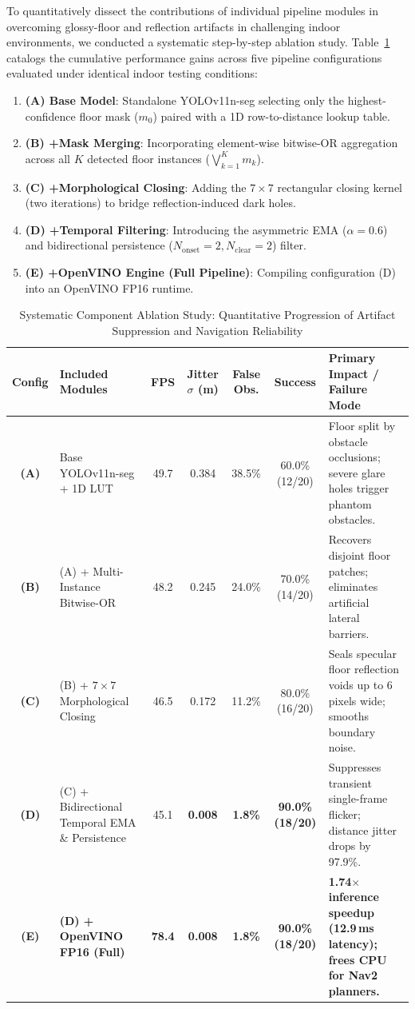 \documentclass{ieeeaccess}
\begin{document}
To quantitatively dissect the contributions of individual pipeline modules in overcoming glossy-floor and reflection artifacts in challenging indoor environments, we conducted a systematic step-by-step ablation study. Table~\ref{tab:ablation_study} catalogs the cumulative performance gains across five pipeline configurations evaluated under identical indoor testing conditions:
\begin{enumerate}
  \item \textbf{(A) Base Model}: Standalone YOLOv11n-seg selecting only the highest-confidence floor mask ($m_0$) paired with a 1D row-to-distance lookup table.
  \item \textbf{(B) +Mask Merging}: Incorporating element-wise bitwise-OR aggregation across all $K$ detected floor instances ($\bigvee_{k=1}^K m_k$).
  \item \textbf{(C) +Morphological Closing}: Adding the $7 \times 7$ rectangular closing kernel (two iterations) to bridge reflection-induced dark holes.
  \item \textbf{(D) +Temporal Filtering}: Introducing the asymmetric EMA ($\alpha=0.6$) and bidirectional persistence ($N_{\mathrm{onset}}=2, N_{\mathrm{clear}}=2$) filter.
  \item \textbf{(E) +OpenVINO Engine (Full Pipeline)}: Compiling configuration (D) into an OpenVINO FP16 runtime.
\end{enumerate}

\begin{table}[!t]
  \centering
  \footnotesize
  \caption{Systematic Component Ablation Study: Quantitative Progression of Artifact Suppression and Navigation Reliability}
  \label{tab:ablation_study}
  \begin{tabularx}{\textwidth}{@{}clccccX@{}}
    \toprule
    Config & Included Modules & FPS & Jitter $\sigma$ (m) & False Obs. & Success & Primary Impact / Failure Mode \\
    \midrule
    \textbf{(A)} & Base YOLOv11n-seg + 1D LUT & 49.7 & 0.384 & 38.5\% & 60.0\% (12/20) & Floor split by obstacle occlusions; severe glare holes trigger phantom obstacles. \\
    \textbf{(B)} & (A) + Multi-Instance Bitwise-OR & 48.2 & 0.245 & 24.0\% & 70.0\% (14/20) & Recovers disjoint floor patches; eliminates artificial lateral barriers. \\
    \textbf{(C)} & (B) + $7 \times 7$ Morphological Closing & 46.5 & 0.172 & 11.2\% & 80.0\% (16/20) & Seals specular floor reflection voids up to 6 pixels wide; smooths boundary noise. \\
    \textbf{(D)} & (C) + Bidirectional Temporal EMA \& Persistence & 45.1 & \textbf{0.008} & \textbf{1.8\%} & \textbf{90.0\% (18/20)} & Suppresses transient single-frame flicker; distance jitter drops by 97.9\%. \\
    \textbf{(E)} & \textbf{(D) + OpenVINO FP16 (Full)} & \textbf{78.4} & \textbf{0.008} & \textbf{1.8\%} & \textbf{90.0\% (18/20)} & \textbf{1.74$\times$ inference speedup (12.9\,ms latency); frees CPU for Nav2 planners.} \\
    \bottomrule
  \end{tabularx}
\end{table}
\end{document}
